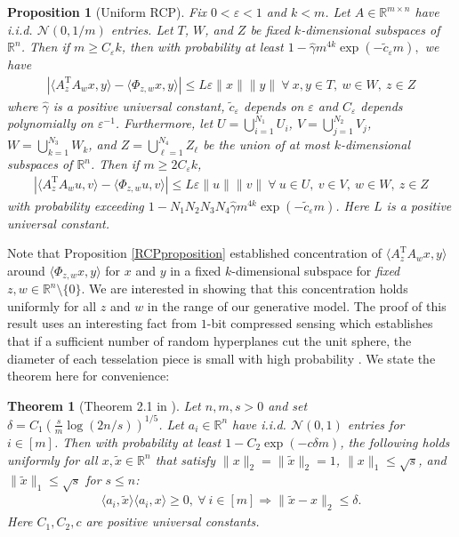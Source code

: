 \documentclass[11pt]{article}
\renewcommand{\epsilon}{\varepsilon}
\newcommand{\R}{\mathbb{R}}
\renewcommand{\top}{{\mathrm{T}}}
\newtheorem{thm}{Theorem}
\newtheorem{prop}{Proposition}
\theoremstyle{remark}
\begin{document}
\begin{prop}[Uniform RCP]\label{uniformrcp} 
Fix $0 < \epsilon < 1$ and $k < m$. Let $A \in \R^{m \times n}$ have i.i.d. $\mathcal{N}(0,1/m)$ entries. Let $T$, $W$, and $Z$ be fixed $k$-dimensional subspaces of $\R^n$. Then if $m \geqslant  C_{\epsilon}k$, then with probability at least $1 - \hat{\gamma} m^{4k}\exp(-\tilde{c}_{\epsilon} m),$ we have \begin{align}
\left|\langle A_z^\top A_w x,y \rangle - \langle \Phi_{z,w}x,y \rangle\right| \leqslant L\epsilon \|x\|\|y\|\ \forall\ x,y \in T,\ w \in W,\ z \in Z \label{Uniform_RCP_firstbound}
\end{align} where $\hat{\gamma}$ is a positive universal constant, $\tilde{c}_{\epsilon}$ depends on $\epsilon$ and $C_{\epsilon}$ depends polynomially on $\epsilon^{-1}$. Furthermore, let $U = \bigcup_{i=1}^{N_1} U_i$, $V = \bigcup_{j=1}^{N_2} V_j$, $W = \bigcup_{k=1}^{N_3} W_k$, and $Z = \bigcup_{\ell=1}^{N_4} Z_{\ell}$ be the union of at most $k$-dimensional subspaces of $\R^n$. Then if $m \geqslant 2C_{\epsilon}k$,
\begin{align}
\left|\langle A_z^\top A_w u,v \rangle - \langle \Phi_{z,w}u,v \rangle\right| \leqslant L\epsilon \|u\|\|v\|\ \forall\ u \in U,\ v \in V,\ w \in W,\ z \in Z \label{Uniform_RCP_secondbound}
\end{align} with probability exceeding $1 - N_1N_2N_3N_4\hat{\gamma} m^{4k}\exp(-\tilde{c}_{\epsilon} m)$. Here $L$ is a positive universal constant.
\end{prop}

Note that Proposition \ref{RCPproposition} established concentration of $\langle A_z^\top A_w x,y \rangle$ around $\langle \Phi_{z,w}x,y \rangle$ for $x$ and $y$ in a fixed $k$-dimensional subspace for \textit{fixed} $z,w \in \R^n \setminus\{0\}$. We are interested in showing that this concentration holds uniformly for all $z$ and $w$ in the range of our generative model. The proof of this result uses an interesting fact from $1$-bit compressed sensing which establishes that if a sufficient number of random hyperplanes cut the unit sphere, the diameter of each tesselation piece is small with high probability \citep{Vershynin_hyperplane_thm}. We state the theorem here for convenience:

\begin{thm}[Theorem 2.1 in \cite{Vershynin_hyperplane_thm}]\label{randhyperplanethm}
Let $n,m,s > 0$ and set $\delta = C_1 \left(\frac{s}{m} \log(2n/s)\right)^{1/5}$. Let $a_i \in \R^n$ have i.i.d. $\mathcal{N}(0,1)$ entries for $i \in [m]$. Then with probability at least $1 - C_2 \exp(- c \delta m)$, the following holds uniformly for all $x,\tilde{x} \in \R^n$ that satisfy $\|x\|_2 = \|\tilde{x}\|_2 = 1$, $\|x\|_1 \leqslant \sqrt{s}$, and $\|\tilde{x}\|_1 \leqslant \sqrt{s}$ for $s \leqslant n$: \begin{align}
\langle a_i, \tilde{x} \rangle \langle a_i, x \rangle \geqslant 0,\ \forall\ i \in [m] \Longrightarrow \|\tilde{x} - x\|_2 \leqslant \delta.
\end{align} Here $C_1, C_2, c$ are positive universal constants.
\end{thm}
\end{document}
